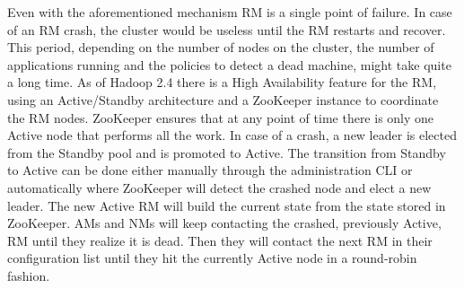 Even with the aforementioned mechanism RM is a single point of
failure. In case of an RM crash, the cluster would be useless until
the RM restarts and recover. This period, depending on the number of
nodes on the cluster, the number of applications running and the
policies to detect a dead machine, might take quite a long time. As of
Hadoop 2.4 there is a High Availability feature for the RM, using an
Active/Standby architecture and a ZooKeeper instance to coordinate
the RM nodes. ZooKeeper
ensures that at any point of time there is only one Active node that
performs all the work. In case of a crash, a new leader is elected
from the Standby pool and is promoted to Active. The transition from
Standby to Active can be done either manually through the administration
CLI or automatically where ZooKeeper will detect the crashed node and
elect a new leader. The new Active RM will build the current state
from the state stored in ZooKeeper. AMs and NMs will keep contacting
the crashed, previously Active, RM until they realize it is dead. Then
they will contact the next RM in their configuration list until they
hit the currently Active node in a round-robin fashion.
